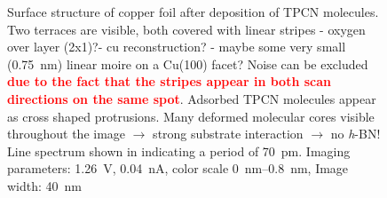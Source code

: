 \begin{figure}\centering
	 \quad
	\caption{Surface structure of copper foil after deposition of TPCN molecules. Two terraces are visible, both covered with linear stripes - oxygen over layer (2x1)?- cu reconstruction? - maybe some very small (\SI{0.75}{\nm}) linear moire on a Cu(100) facet? Noise can be excluded \textcolor{red}{\textbf{due to the fact that the stripes appear in both scan directions on the same spot}}. Adsorbed TPCN molecules appear as cross shaped protrusions. Many deformed molecular cores visible throughout the image $\rightarrow$ strong substrate interaction $\rightarrow$ no \textit{h}-BN! Line spectrum shown in  indicating a period of \SI{70}{\pico \meter}. Imaging parameters: 		
		\SI{1.26}{\volt}, \SI{0.04}{\nano\ampere}, 
		color scale \SIrange{0}{0.8}{\nano \meter}, 
		Image width: \SI{40}{\nano \meter} }
	\label{fig:tpcn-on-cu-foil}
\end{figure}


